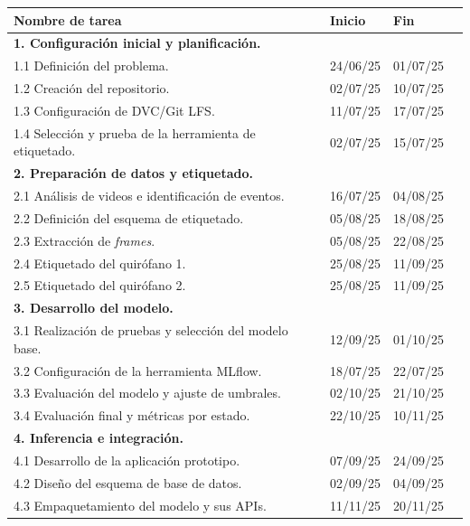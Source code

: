 \documentclass[
11pt, %
]{charter}
\begin{document}
\begin{table}[ht]
	\begin{tabularx}{\linewidth}{@{}|l|X|X|l|@{}}
		\hline
		\rowcolor[HTML]{C0C0C0}
		\textbf{Nombre de tarea} & \textbf{Inicio} & \textbf{Fin} \\ \hline
		\multicolumn{3}{|l|}{\textbf{1. Configuración inicial y planificación.}} \\ \hline
		1.1 Definición del problema. & 24/06/25 & 01/07/25 \\ \hline
		1.2 Creación del repositorio. & 02/07/25 & 10/07/25 \\ \hline
		1.3 Configuración de DVC/Git LFS. & 11/07/25 & 17/07/25 \\ \hline
		1.4 Selección y prueba de la herramienta de etiquetado. & 02/07/25 & 15/07/25 \\ \hline
		\multicolumn{3}{|l|}{\textbf{2. Preparación de datos y etiquetado.}} \\ \hline
		2.1 Análisis de videos e identificación de eventos. & 16/07/25 & 04/08/25 \\ \hline
		2.2 Definición del esquema de etiquetado. & 05/08/25 & 18/08/25 \\ \hline
		2.3 Extracción de \textit{frames}. & 05/08/25 & 22/08/25 \\ \hline
		2.4 Etiquetado del quirófano 1. & 25/08/25 & 11/09/25 \\ \hline
		2.5 Etiquetado del quirófano 2. & 25/08/25 & 11/09/25 \\ \hline
		\multicolumn{3}{|l|}{\textbf{3. Desarrollo del modelo.}} \\ \hline
		3.1 Realización de pruebas y selección del modelo base. & 12/09/25 & 01/10/25 \\ \hline
		3.2 Configuración de la herramienta MLflow. & 18/07/25 & 22/07/25 \\ \hline
		3.3 Evaluación del modelo y ajuste de umbrales. & 02/10/25 & 21/10/25 \\ \hline
		3.4 Evaluación final y métricas por estado. & 22/10/25 & 10/11/25 \\ \hline
		\multicolumn{3}{|l|}{\textbf{4. Inferencia e integración.}} \\ \hline
		4.1 Desarrollo de la aplicación prototipo. & 07/09/25 & 24/09/25 \\ \hline
		4.2 Diseño del esquema de base de datos. & 02/09/25 & 04/09/25 \\ \hline
		4.3 Empaquetamiento del modelo y sus APIs. & 11/11/25 & 20/11/25 \\ \hline

\end{tabularx}
\end{table}
\end{document}
